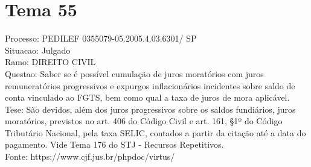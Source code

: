 \documentclass[12pt]{article}
\begin{document}
\section*{Tema 55}
Processo: PEDILEF 0355079-05.2005.4.03.6301/ SP\\
Situacao: Julgado\\
Ramo: DIREITO CIVIL\\
Questao: Saber se é possível cumulação de juros moratórios com juros remuneratórios progressivos e expurgos inflacionários incidentes sobre saldo de conta vinculado ao FGTS, bem como qual a taxa de juros de mora aplicável.\\
Tese: São devidos, além dos juros progressivos sobre os saldos fundiários, juros moratórios, previstos no art. 406 do Código Civil e art. 161, §1º do Código Tributário Nacional, pela taxa SELIC, contados a partir da citação até a data do pagamento. Vide Tema 176 do STJ - Recursos Repetitivos.\\
Fonte: https://www.cjf.jus.br/phpdoc/virtus/
\end{document}
